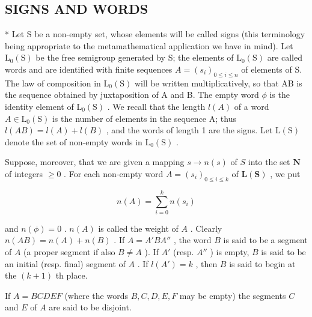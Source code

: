 \subsection{SIGNS AND WORDS}

* Let S be a non-empty set, whose elements will be called signs (this terminology being appropriate to the metamathematical application we have in mind). Let \(\mathrm{L}_{0}(\mathrm{S})\) be the free semigroup generated by S; the elements of \(\mathrm{L}_{0}(\mathrm{S})\) are called words and are identified with finite sequences \(A = (s_{i})_{0 \leqslant i \leqslant n}\) of elements of S. The law of composition in \(\mathrm{L}_{0}(\mathrm{S})\) will be written multiplicatively, so that AB is the sequence obtained by juxtaposition of A and B. The empty word \(\phi\) is the identity element of \(\mathrm{L}_{0}(\mathrm{S})\) . We recall that the length \(l(A)\) of a word \(A \in \mathrm{L}_{0}(\mathrm{S})\) is the number of elements in the sequence A; thus \(l(AB) = l(A) + l(B)\) , and the words of length 1 are the signs. Let \(\mathrm{L}(\mathrm{S})\) denote the set of non-empty words in \(\mathrm{L}_{0}(\mathrm{S})\) .

Suppose, moreover, that we are given a mapping \(s \to n(s)\) of \(S\) into the set \(\mathbf{N}\) of integers \(\geqslant 0\) . For each non-empty word \(A = (s_i)_{0 \leqslant i \leqslant k}\) of \(\mathbf{L}(\mathbf{S})\) , we put

\[
n (A) = \sum_ {i = 0} ^ {k} n (s _ {i})
\]

and \(n(\phi) = 0\) . \(n(A)\) is called the weight of \(A\) . Clearly \(n(AB) = n(A) + n(B)\) . If \(A = A'BA''\) , the word \(B\) is said to be a segment of \(A\) (a proper segment if also \(B \neq A\) ). If \(A'\) (resp. \(A''\) ) is empty, \(B\) is said to be an initial (resp. final) segment of \(A\) . If \(l(A') = k\) , then \(B\) is said to begin at the \((k + 1)\) th place.

If \(A = BCDEF\) (where the words \(B, C, D, E, F\) may be empty) the segments \(C\) and \(E\) of \(A\) are said to be disjoint.

